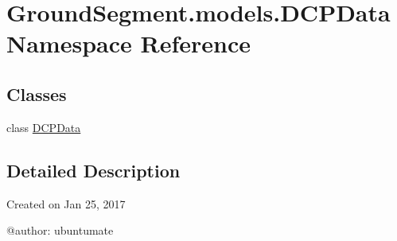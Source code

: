 \hypertarget{namespace_ground_segment_1_1models_1_1_d_c_p_data}{}\section{Ground\+Segment.\+models.\+D\+C\+P\+Data Namespace Reference}
\label{namespace_ground_segment_1_1models_1_1_d_c_p_data}
\subsection*{Classes}
\begin{DoxyCompactItemize}
\item 
class \hyperlink{class_ground_segment_1_1models_1_1_d_c_p_data_1_1_d_c_p_data}{D\+C\+P\+Data}
\end{DoxyCompactItemize}


\subsection{Detailed Description}
\begin{DoxyVerb}Created on Jan 25, 2017

@author: ubuntumate
\end{DoxyVerb}
 